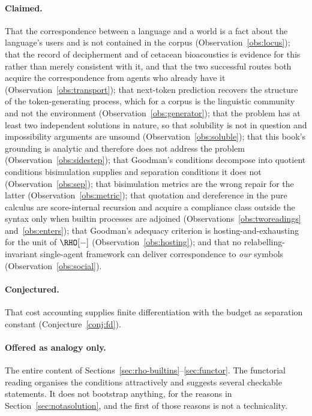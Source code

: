 \paragraph{Claimed.}
That the correspondence between a language and a world is a fact
about the language's users and is not contained in the corpus
(Observation~\ref{obs:locus}); that the record of decipherment and
of cetacean bioacoustics is evidence for this rather than merely
consistent with it, and that the two successful routes both acquire
the correspondence from agents who already have it
(Observation~\ref{obs:transport}); that next-token prediction
recovers the structure of the token-generating process, which for a
corpus is the linguistic community and not the environment
(Observation~\ref{obs:generator}); that the problem has at least
two independent solutions in nature, so that solubility is not in
question and impossibility arguments are unsound
(Observation~\ref{obs:soluble}); that this book's grounding is
analytic and therefore does not address the problem
(Observation~\ref{obs:sidestep}); that Goodman's conditions
decompose into quotient conditions bisimulation supplies and
separation conditions it does not (Observation~\ref{obs:sep}); that
bisimulation metrics are the wrong repair for the latter
(Observation~\ref{obs:metric}); that quotation and dereference in
the pure calculus are score-internal recursion and acquire a
compliance class outside the syntax only when builtin processes are
adjoined (Observations~\ref{obs:tworeadings}
and~\ref{obs:enters}); that Goodman's adequacy criterion is
hosting-and-exhausting for the unit of $\RHO[-]$
(Observation~\ref{obs:hosting}); and that no relabelling-invariant
single-agent framework can deliver correspondence to \emph{our}
symbols (Observation~\ref{obs:social}).

\paragraph{Conjectured.}
That cost accounting supplies finite differentiation with the
budget as separation constant (Conjecture~\ref{conj:fd}).

\paragraph{Offered as analogy only.}
The entire content of
Sections~\ref{sec:rho-builtins}--\ref{sec:functor}.
The functorial reading organises the conditions attractively and
suggests several checkable statements.
It does not bootstrap anything, for the reasons in
Section~\ref{sec:notasolution}, and the first of those reasons is
not a technicality.

